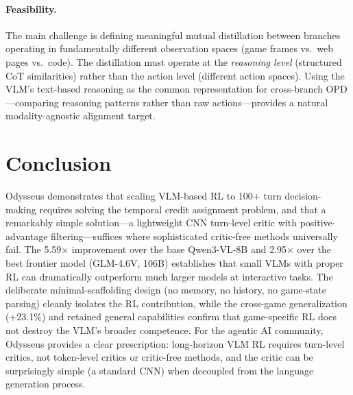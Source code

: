 \documentclass[11pt]{article}
\begin{document}
\paragraph{Feasibility.}
The main challenge is defining meaningful mutual distillation between branches operating in fundamentally different observation spaces (game frames vs.\ web pages vs.\ code). The distillation must operate at the \emph{reasoning level} (structured CoT similarities) rather than the action level (different action spaces). Using the VLM's text-based reasoning as the common representation for cross-branch OPD---comparing reasoning patterns rather than raw actions---provides a natural modality-agnostic alignment target.

\section{Conclusion}

Odysseus demonstrates that scaling VLM-based RL to 100+ turn decision-making requires solving the temporal credit assignment problem, and that a remarkably simple solution---a lightweight CNN turn-level critic with positive-advantage filtering---suffices where sophisticated critic-free methods universally fail. The 5.59$\times$ improvement over the base Qwen3-VL-8B and 2.95$\times$ over the best frontier model (GLM-4.6V, 106B) establishes that small VLMs with proper RL can dramatically outperform much larger models at interactive tasks. The deliberate minimal-scaffolding design (no memory, no history, no game-state parsing) cleanly isolates the RL contribution, while the cross-game generalization (+23.1\%) and retained general capabilities confirm that game-specific RL does not destroy the VLM's broader competence. For the agentic AI community, Odysseus provides a clear prescription: long-horizon VLM RL requires turn-level critics, not token-level critics or critic-free methods, and the critic can be surprisingly simple (a standard CNN) when decoupled from the language generation process.
\end{document}
